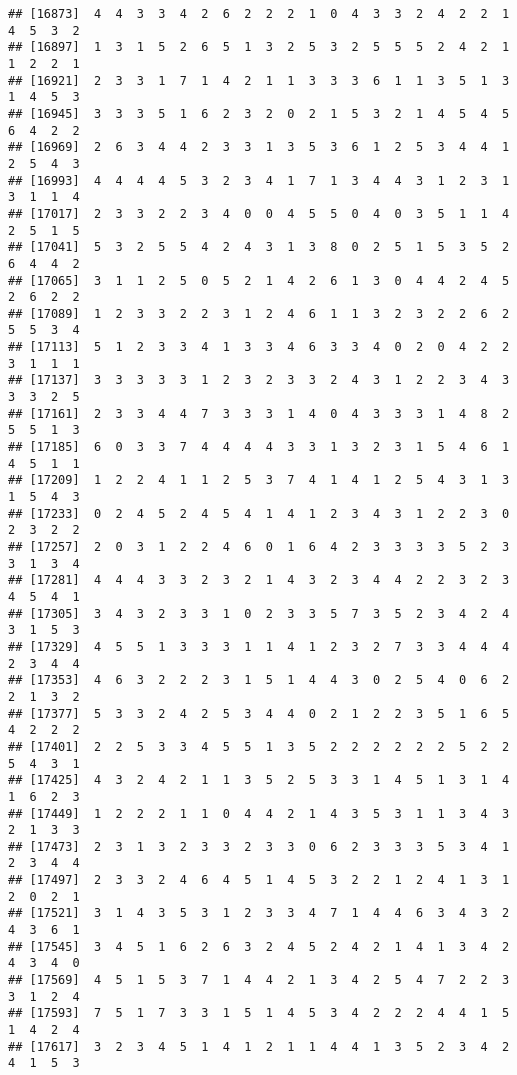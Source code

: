 \documentclass[
]{article}
\begin{document}
\begin{verbatim}
## [16873]  4  4  3  3  4  2  6  2  2  2  1  0  4  3  3  2  4  2  2  1  4  5  3  2
## [16897]  1  3  1  5  2  6  5  1  3  2  5  3  2  5  5  5  2  4  2  1  1  2  2  1
## [16921]  2  3  3  1  7  1  4  2  1  1  3  3  3  6  1  1  3  5  1  3  1  4  5  3
## [16945]  3  3  3  5  1  6  2  3  2  0  2  1  5  3  2  1  4  5  4  5  6  4  2  2
## [16969]  2  6  3  4  4  2  3  3  1  3  5  3  6  1  2  5  3  4  4  1  2  5  4  3
## [16993]  4  4  4  4  5  3  2  3  4  1  7  1  3  4  4  3  1  2  3  1  3  1  1  4
## [17017]  2  3  3  2  2  3  4  0  0  4  5  5  0  4  0  3  5  1  1  4  2  5  1  5
## [17041]  5  3  2  5  5  4  2  4  3  1  3  8  0  2  5  1  5  3  5  2  6  4  4  2
## [17065]  3  1  1  2  5  0  5  2  1  4  2  6  1  3  0  4  4  2  4  5  2  6  2  2
## [17089]  1  2  3  3  2  2  3  1  2  4  6  1  1  3  2  3  2  2  6  2  5  5  3  4
## [17113]  5  1  2  3  3  4  1  3  3  4  6  3  3  4  0  2  0  4  2  2  3  1  1  1
## [17137]  3  3  3  3  3  1  2  3  2  3  3  2  4  3  1  2  2  3  4  3  3  3  2  5
## [17161]  2  3  3  4  4  7  3  3  3  1  4  0  4  3  3  3  1  4  8  2  5  5  1  3
## [17185]  6  0  3  3  7  4  4  4  4  3  3  1  3  2  3  1  5  4  6  1  4  5  1  1
## [17209]  1  2  2  4  1  1  2  5  3  7  4  1  4  1  2  5  4  3  1  3  1  5  4  3
## [17233]  0  2  4  5  2  4  5  4  1  4  1  2  3  4  3  1  2  2  3  0  2  3  2  2
## [17257]  2  0  3  1  2  2  4  6  0  1  6  4  2  3  3  3  3  5  2  3  3  1  3  4
## [17281]  4  4  4  3  3  2  3  2  1  4  3  2  3  4  4  2  2  3  2  3  4  5  4  1
## [17305]  3  4  3  2  3  3  1  0  2  3  3  5  7  3  5  2  3  4  2  4  3  1  5  3
## [17329]  4  5  5  1  3  3  3  1  1  4  1  2  3  2  7  3  3  4  4  4  2  3  4  4
## [17353]  4  6  3  2  2  2  3  1  5  1  4  4  3  0  2  5  4  0  6  2  2  1  3  2
## [17377]  5  3  3  2  4  2  5  3  4  4  0  2  1  2  2  3  5  1  6  5  4  2  2  2
## [17401]  2  2  5  3  3  4  5  5  1  3  5  2  2  2  2  2  2  5  2  2  5  4  3  1
## [17425]  4  3  2  4  2  1  1  3  5  2  5  3  3  1  4  5  1  3  1  4  1  6  2  3
## [17449]  1  2  2  2  1  1  0  4  4  2  1  4  3  5  3  1  1  3  4  3  2  1  3  3
## [17473]  2  3  1  3  2  3  3  2  3  3  0  6  2  3  3  3  5  3  4  1  2  3  4  4
## [17497]  2  3  3  2  4  6  4  5  1  4  5  3  2  2  1  2  4  1  3  1  2  0  2  1
## [17521]  3  1  4  3  5  3  1  2  3  3  4  7  1  4  4  6  3  4  3  2  4  3  6  1
## [17545]  3  4  5  1  6  2  6  3  2  4  5  2  4  2  1  4  1  3  4  2  4  3  4  0
## [17569]  4  5  1  5  3  7  1  4  4  2  1  3  4  2  5  4  7  2  2  3  3  1  2  4
## [17593]  7  5  1  7  3  3  1  5  1  4  5  3  4  2  2  2  4  4  1  5  1  4  2  4
## [17617]  3  2  3  4  5  1  4  1  2  1  1  4  4  1  3  5  2  3  4  2  4  1  5  3

\end{verbatim}
\end{document}
